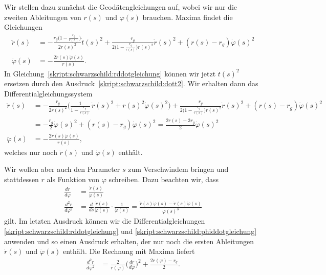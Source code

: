 Wir stellen dazu zunächst die Geodätengleichungen auf, wobei wir
nur die zweiten Ableitungen von $r(s)$ und $\varphi(s)$ brauchen.
Maxima findet die Gleichungen
\begin{align}
\ddot r(s)
&=
-\frac{r_g\biggl(\displaystyle 1-\frac{r_g}{r(s)}\biggr)}{2r(s)^2}\dot t(s)^2
+
\frac{r_g}{2\biggl(1-\displaystyle\frac{r_g}{r(s)}\biggr) r(s)^2}\dot r(s)^2
+
(r(s)-r_g)\dot\varphi(s)^2
\label{skript:schwarzschild:rddotgleichung}
\\
\ddot\varphi(s)
&=
-\frac{2\dot r(s)\dot \varphi(s)}{r(s)}.
\label{skript:schwarzschild:phiddotgleichung}
\end{align}
In Gleichung~\eqref{skript:schwarzschild:rddotgleichung} können wir jetzt
$\dot t(s)^2$ ersetzen durch den Ausdruck~\eqref{skript:schwarzschild:dott2}.
Wir erhalten dann das Differentialgleichungssystem
\begin{align}
\ddot r(s)
&=
-\frac{r_g}{2r(s)^2}\biggl(
\frac{1}{\displaystyle 1-\frac{r_g}{r(s)}}\,\dot r(s)^2
+ r(s)^2\dot \varphi(s)^2
\biggr)
+
\frac{r_g}{2\biggl(1-\displaystyle\frac{r_g}{r(s)}\biggr) r(s)^2}\dot r(s)^2
+
(r(s)-r_g)\dot\varphi(s)^2
\\
&=
-\frac{r_g}{2}\dot\varphi(s)^2
+
(r(s)-r_g)\dot\varphi(s)^2
=
\frac{2r(s)-3r_g}{2}\dot\varphi(s)^2
\\
\ddot\varphi(s)
&=
-\frac{2\dot r(s)\dot \varphi(s)}{r(s)},
\label{skript:schwarzschild:phiddotgleichung2}
\end{align}
welches nur noch $\dot r(s)$ und
$\dot\varphi(s)$ enthält.

Wir wollen aber auch den Parameter $s$ zum Verschwindem bringen und
stattdessen $r$ als Funktion von $\varphi$ schreiben.
Dazu beachten wir, dass
\begin{align*}
\frac{dr}{d\varphi}
&=
\frac{\dot r(s)}{\dot \varphi(s)}
\\
\frac{d^2r}{d\varphi^2}
&=
\frac{d}{ds}
\frac{\dot r(s)}{\dot \varphi(s)}
\cdot
\frac{1}{\dot\varphi(s)}
=
\frac{\ddot r(s)\dot \varphi(s) - \dot r(s)\ddot\varphi(s)}{\dot\varphi(s)^3}
\end{align*}
gilt.
Im letzten Ausdruck können wir die Differentialgleichungen
\eqref{skript:schwarzschild:rddotgleichung}
und
\eqref{skript:schwarzschild:phiddotgleichung}
anwenden und so einen Ausdruck erhalten, der nur noch die ersten Ableitungen 
$\dot r(s)$ und $\dot\varphi(s)$ enthält.
Die Rechnung mit Maxima liefert
\begin{align}
\frac{d^2r}{d\varphi^2}
&=
\frac{2}{r(\varphi)}
\biggl(\frac{dr}{d\varphi}\biggr)^2
+\frac{2r(\varphi)-r_g}{2}.
\label{skript:schwarzschild:rphidgl}
\end{align}

